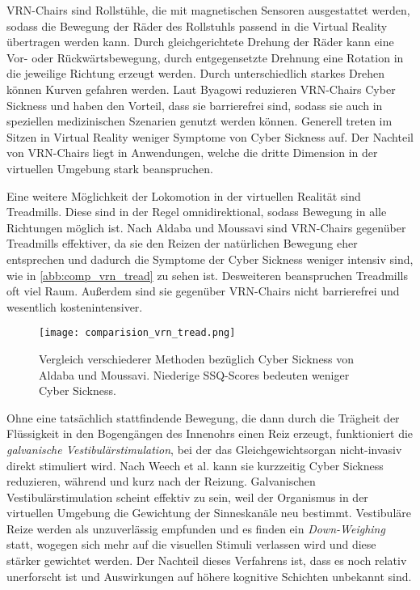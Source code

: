 VRN-Chairs sind Rollst\"uhle, die mit magnetischen Sensoren ausgestattet werden, sodass die Bewegung der R\"ader des Rollstuhls passend in die Virtual Reality \"ubertragen werden kann. Durch gleichgerichtete Drehung der R\"ader kann eine Vor- oder R\"uckw\"artsbewegung, durch entgegensetzte Drehnung eine Rotation in die jeweilige Richtung erzeugt werden. Durch unterschiedlich starkes Drehen k\"onnen Kurven gefahren werden. Laut Byagowi\cite{Byagowi:2014:VRNchair} reduzieren VRN-Chairs Cyber Sickness und haben den Vorteil, dass sie barrierefrei sind, sodass sie auch in speziellen medizinischen Szenarien genutzt werden k\"onnen. Generell treten im Sitzen in Virtual Reality weniger Symptome von Cyber Sickness auf. Der Nachteil von VRN-Chairs liegt in Anwendungen, welche die dritte Dimension in der virtuellen Umgebung stark beanspruchen.

Eine weitere M\"oglichkeit der Lokomotion in der virtuellen Realit\"at sind Treadmills. Diese sind in der Regel omnidirektional, sodass Bewegung in alle Richtungen m\"oglich ist. Nach Aldaba und Moussavi\cite{Aldaba:2019:VRNTread} sind VRN-Chairs gegen\"uber Treadmills effektiver, da sie den Reizen der nat\"urlichen Bewegung eher entsprechen und dadurch die Symptome der Cyber Sickness weniger intensiv sind, wie in \autoref{abb:comp_vrn_tread} zu sehen ist. Desweiteren beanspruchen Treadmills oft viel Raum. Au{\ss}erdem sind sie gegen\"uber VRN-Chairs nicht barrierefrei und wesentlich kostenintensiver.

\begin{figure}[h]
	\centering 
	\texttt{[image: comparision\_vrn\_tread.png]}
	\caption{Vergleich verschiederer Methoden bez\"uglich Cyber Sickness von Aldaba und Moussavi\cite{Aldaba:2019:VRNTread}. Niederige SSQ-Scores bedeuten weniger Cyber Sickness.}
	\label{abb:comp_vrn_tread}
\end{figure}

Ohne eine tats\"achlich stattfindende Bewegung, die dann durch die Tr\"agheit der Fl\"ussigkeit in den Bogeng\"angen des Innenohrs einen Reiz erzeugt, funktioniert die \textit{galvanische Vestibul\"arstimulation}, bei der das Gleichgewichtsorgan nicht-invasiv direkt stimuliert wird. Nach Weech et al.\cite{Weech:2020:GVS} kann sie kurzzeitig Cyber Sickness reduzieren, w\"ahrend und kurz nach der Reizung.
Galvanischen Vestibul\"arstimulation scheint effektiv zu sein, weil der Organismus in der virtuellen Umgebung die Gewichtung der Sinneskan\"ale neu bestimmt. Vestibul\"are Reize werden als unzuverl\"assig empfunden und es finden ein \textit{Down-Weighing} statt, wogegen sich mehr auf die visuellen Stimuli verlassen wird und diese st\"arker gewichtet werden.
Der Nachteil dieses Verfahrens ist, dass es noch relativ unerforscht ist und Auswirkungen auf h\"ohere kognitive Schichten unbekannt sind.

